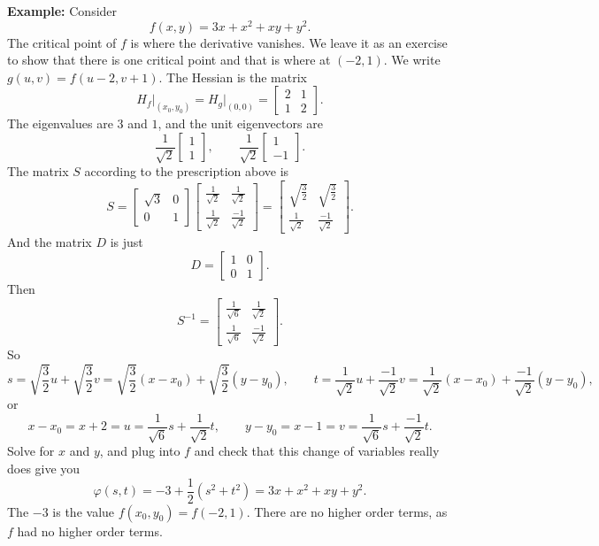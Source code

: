 \documentclass[12pt]{article}
\begin{document}
\bigskip

\textbf{Example:}
Consider
\[
f(x,y) = 3x+x^2+xy+y^2.
\]
The critical point of $f$ is where the derivative vanishes.  We leave it as
an exercise to show that there is one critical point and that is
where at $(-2,1)$.
We write $g(u,v) = f(u-2,v+1)$.  The Hessian is the matrix
\[
H_f\big|_{(x_0,y_0)} = H_g\big|_{(0,0)}
=
\begin{bmatrix}
2 & 1 \\
1 & 2
\end{bmatrix} .
\]
The eigenvalues are $3$ and $1$, and the unit eigenvectors are 
\[
\frac{1}{\sqrt{2}}
\begin{bmatrix}
1 \\
1
\end{bmatrix} , \qquad
\frac{1}{\sqrt{2}}
\begin{bmatrix}
1 \\
-1
\end{bmatrix} .
\]
The matrix $S$ according to the prescription above is
\[
S =
\begin{bmatrix}
\sqrt{3} & 0 \\
0 & 1
\end{bmatrix}
\begin{bmatrix}
\frac{1}{\sqrt{2}} &
\frac{1}{\sqrt{2}} \\
\frac{1}{\sqrt{2}} &
\frac{-1}{\sqrt{2}} 
\end{bmatrix}
=
\begin{bmatrix}
\sqrt{\frac{3}{2}} &
\sqrt{\frac{3}{2}} \\
\frac{1}{\sqrt{2}} &
\frac{-1}{\sqrt{2}} 
\end{bmatrix} .
\]
And the matrix $D$ is just
\[
D =
\begin{bmatrix}
1 & 0 \\
0 & 1
\end{bmatrix} .
\]
Then
\[
S^{-1} =
\begin{bmatrix}
\frac{1}{\sqrt{6}} &
\frac{1}{\sqrt{2}} \\
\frac{1}{\sqrt{6}} &
\frac{-1}{\sqrt{2}}
\end{bmatrix} .
\]
So
\[
s
=\sqrt{\frac{3}{2}} u +
\sqrt{\frac{3}{2}} v 
=\sqrt{\frac{3}{2}} (x-x_0) +
\sqrt{\frac{3}{2}} (y-y_0) , \qquad
t
= \frac{1}{\sqrt{2}} u + \frac{-1}{\sqrt{2}} v 
= \frac{1}{\sqrt{2}} (x-x_0) + \frac{-1}{\sqrt{2}} (y-y_0) ,
\]
or
\[
x-x_0 = x+2 = u = 
\frac{1}{\sqrt{6}} s + 
\frac{1}{\sqrt{2}} t , \qquad
y-y_0 = x-1 = v = \frac{1}{\sqrt{6}} s + 
\frac{-1}{\sqrt{2}} t .
\]
Solve for $x$ and $y$, and plug into $f$ and check that this change
of variables really does give you
\[
\varphi(s,t) = -3 + \frac{1}{2} ( s^2 + t^2 ) = 3x + x^2+xy+y^2 .
\]
The $-3$ is the value $f(x_0,y_0) = f(-2,1)$.  There are no higher order terms,
as $f$ had no higher order terms.
\end{document}
